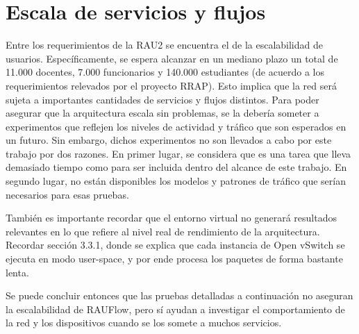 \section{Escala de servicios y flujos}
Entre los requerimientos de la RAU2 se encuentra el de la escalabilidad de usuarios. Específicamente, se espera alcanzar en un mediano plazo un total de 11.000 docentes, 7.000 funcionarios y 140.000 estudiantes (de acuerdo a los requerimientos relevados por el proyecto RRAP). Esto implica que la red será sujeta a importantes cantidades de servicios y flujos distintos. Para poder asegurar que la arquitectura escala sin problemas, se la debería someter a experimentos que reflejen los niveles de actividad y tráfico que son esperados en un futuro. Sin embargo, dichos experimentos no son llevados a cabo por este trabajo por dos razones. En primer lugar, se considera que es una tarea que lleva demasiado tiempo como para ser incluida dentro del alcance de este trabajo. En segundo lugar, no están disponibles los modelos y patrones de tráfico que serían necesarios para esas pruebas.

También es importante recordar que el entorno virtual no generará resultados relevantes en lo que refiere al nivel real de rendimiento de la arquitectura. Recordar sección 3.3.1, donde se explica que cada instancia de Open vSwitch se ejecuta en modo user-space, y por ende procesa los paquetes de forma bastante lenta.

Se puede concluir entonces que las pruebas detalladas a continuación no aseguran la escalabilidad de RAUFlow, pero sí ayudan a investigar el comportamiento de la red y los dispositivos cuando se los somete a muchos servicios.

